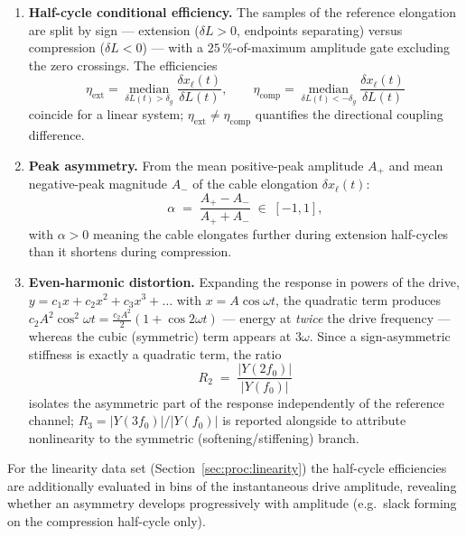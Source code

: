 \begin{enumerate}
  \item \textbf{Half-cycle conditional efficiency.} The samples of the
  reference elongation are split by sign — extension
  ($\delta L > 0$, endpoints separating) versus compression
  ($\delta L < 0$) — with a $25\,\%$-of-maximum amplitude gate excluding the
  zero crossings. The efficiencies
  \begin{equation}
    \eta_\mathrm{ext} = \operatorname*{median}_{\delta L(t) > \delta_g}
      \frac{\delta x_\ell(t)}{\delta L(t)},
    \qquad
    \eta_\mathrm{comp} = \operatorname*{median}_{\delta L(t) < -\delta_g}
      \frac{\delta x_\ell(t)}{\delta L(t)}
    \label{eq:etahalfcycle}
  \end{equation}
  coincide for a linear system; $\eta_\mathrm{ext} \ne \eta_\mathrm{comp}$
  quantifies the directional coupling difference.

  \item \textbf{Peak asymmetry.} From the mean positive-peak amplitude
  $A_+$ and mean negative-peak magnitude $A_-$ of the cable elongation
  $\delta x_\ell(t)$:
  \begin{equation}
    \alpha \;=\; \frac{A_+ - A_-}{A_+ + A_-} \;\in\; [-1, 1],
    \label{eq:peakasym}
  \end{equation}
  with $\alpha > 0$ meaning the cable elongates further during extension
  half-cycles than it shortens during compression.

  \item \textbf{Even-harmonic distortion.} Expanding the response in powers
  of the drive, $y = c_1 x + c_2 x^2 + c_3 x^3 + \dots$ with
  $x = A\cos\omega t$, the quadratic term produces
  $c_2 A^2 \cos^2\omega t = \tfrac{c_2 A^2}{2}(1 + \cos 2\omega t)$ — energy
  at \emph{twice} the drive frequency — whereas the cubic (symmetric) term
  appears at $3\omega$. Since a sign-asymmetric stiffness is exactly a
  quadratic term, the ratio
  \begin{equation}
    R_2 \;=\; \frac{|Y(2 f_0)|}{|Y(f_0)|}
    \label{eq:h2ratio}
  \end{equation}
  isolates the asymmetric part of the response independently of the
  reference channel; $R_3 = |Y(3f_0)|/|Y(f_0)|$ is reported alongside to
  attribute nonlinearity to the symmetric (softening/stiffening) branch.
\end{enumerate}

For the linearity data set (Section~\ref{sec:proc:linearity}) the half-cycle
efficiencies are additionally evaluated in bins of the instantaneous drive
amplitude, revealing whether an asymmetry develops progressively with
amplitude (e.g.\ slack forming on the compression half-cycle only).

